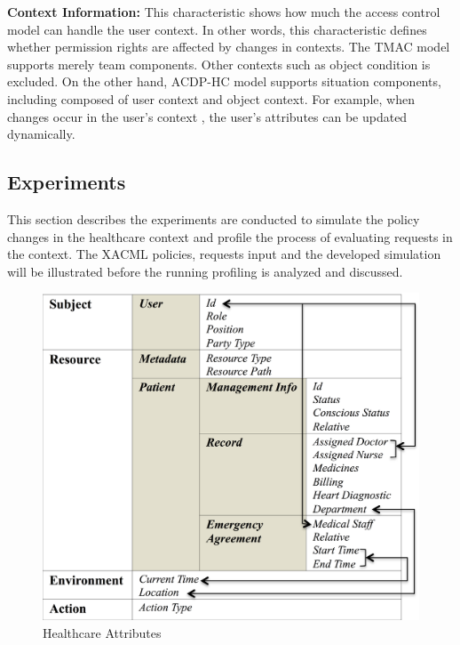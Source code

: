 \documentclass[conference]{IEEEtran}
\begin{document}
\textbf{Context Information: }
This characteristic shows how much the access control model can handle the user context. 
In other words, this characteristic defines whether permission rights are affected by changes in contexts. 
The TMAC model supports merely team components. 
Other contexts such as object condition is excluded.
On the other hand, ACDP-HC model supports situation components, including composed of user context and object context. 
For example, when changes occur in the user's context , the user's attributes can be updated dynamically.

\subsection{Experiments}\label{Evaluate:Exp}

This section describes the experiments are conducted to simulate the policy changes in the healthcare context and profile the process of evaluating requests in the context.
The XACML policies, requests input and the developed simulation will be illustrated before the running profiling is analyzed and discussed.

\begin{figure}[ht!]
	\label{fig:attributes}
	\centering
	\includegraphics[scale=0.4]{fig/attributes.png}
	\caption{Healthcare Attributes}
\end{figure}
\end{document}
